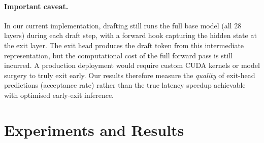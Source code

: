 \documentclass[11pt]{article}
\begin{document}
\noindent{}

\paragraph{Important caveat.}  In our current implementation, drafting still runs the full base model (all 28 layers) during each draft step, with a forward hook capturing the hidden state at the exit layer.  The exit head produces the draft token from this intermediate representation, but the computational cost of the full forward pass is still incurred.  A production deployment would require custom CUDA kernels or model surgery to truly exit early.  Our results therefore measure the \emph{quality} of exit-head predictions (acceptance rate) rather than the true latency speedup achievable with optimised early-exit inference.


\section{Experiments and Results}
\label{sec:results}
\end{document}
